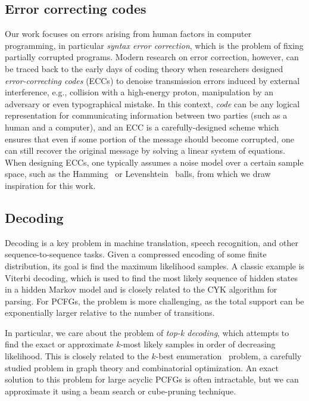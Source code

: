 \documentclass[sigplan,review,acmsmall,nonacm,anonymous]{acmart}\settopmatter{printfolios=false,printccs=false,printacmref=false}
\begin{document}
  \subsection{Error correcting codes}

  Our work focuses on errors arising from human factors in computer programming, in particular \textit{syntax error correction}, which is the problem of fixing partially corrupted programs. Modern research on error correction, however, can be traced back to the early days of coding theory when researchers designed \textit{error-correcting codes} (ECCs) to denoise transmission errors induced by external interference, e.g., collision with a high-energy proton, manipulation by an adversary or even typographical mistake. In this context, \textit{code} can be any logical representation for communicating information between two parties (such as a human and a computer), and an ECC is a carefully-designed scheme which ensures that even if some portion of the message should become corrupted, one can still recover the original message by solving a linear system of equations. When designing ECCs, one typically assumes a noise model over a certain sample space, such as the Hamming~\cite{titsias2017hamming, dong2023number} or Levenshtein~\cite{levenshtein1966binary, becerra2008learning, barlev2021levenshtein} balls, from which we draw inspiration for this work.

  \subsection{Decoding}

Decoding is a key problem in machine translation, speech recognition, and other sequence-to-sequence tasks. Given a compressed encoding of some finite distribution, its goal is find the maximum likelihood samples. A classic example is Viterbi decoding, which is used to find the most likely sequence of hidden states in a hidden Markov model and is closely related to the CYK algorithm for parsing. For PCFGs, the problem is more challenging, as the total support can be exponentially larger relative to the number of transitions.

In particular, we care about the problem of \textit{top-k decoding}, which attempts to find the exact or approximate $k$-most likely samples in order of decreasing likelihood. This is closely related to the $k$-best enumeration~\cite{eppstein2014k} problem, a carefully studied problem in graph theory and combinatorial optimization. An exact solution to this problem for large acyclic PCFGs is often intractable, but we can approximate it using a beam search or cube-pruning technique.
\end{document}
